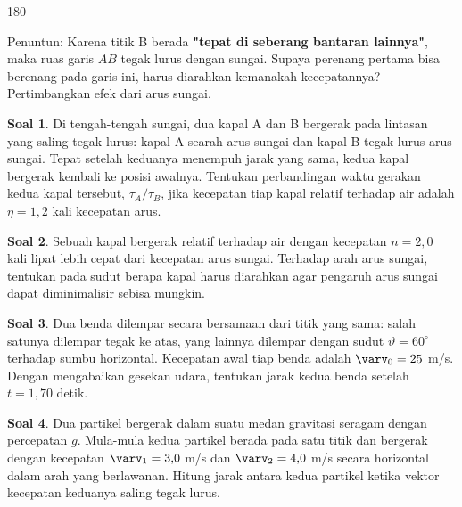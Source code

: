 \documentclass[a4paper, 11.5pt]{article}
\theoremstyle{definition}
\newtheorem{soal}{Soal}
\begin{document}
\begin{flushright}
	\begin{rotate}{180}
		\begin{minipage}{\linewidth}
			\color{lightgray}
			Penuntun: Karena titik B berada \textbf{"tepat di seberang bantaran lainnya"}, maka ruas garis $\overline{AB}$ tegak lurus dengan sungai. Supaya perenang pertama bisa berenang pada garis ini, harus diarahkan kemanakah kecepatannya? Pertimbangkan efek dari arus sungai.
		\end{minipage}
	\end{rotate}	
\end{flushright}

\vspace{1em}

\begin{soal}
	Di tengah-tengah sungai, dua kapal A dan B bergerak pada lintasan yang saling tegak lurus: kapal A searah arus sungai dan kapal B tegak lurus arus sungai. Tepat setelah keduanya menempuh jarak yang sama, kedua kapal bergerak kembali ke posisi awalnya. Tentukan perbandingan waktu gerakan kedua kapal tersebut, $\tau_A / \tau_B$, jika kecepatan tiap kapal relatif terhadap air adalah $\eta = 1{,}2$ kali kecepatan arus.
\end{soal}

\begin{soal}
	Sebuah kapal bergerak relatif terhadap air dengan kecepatan $n = 2{,}0$ kali lipat lebih cepat dari kecepatan arus sungai. Terhadap arah arus sungai, tentukan pada sudut berapa kapal harus diarahkan agar pengaruh arus sungai dapat diminimalisir sebisa mungkin.
\end{soal}

\begin{soal}
	Dua benda dilempar secara bersamaan dari titik yang sama: salah satunya dilempar tegak ke atas, yang lainnya dilempar dengan sudut $\vartheta = 60^\circ$ terhadap sumbu horizontal. Kecepatan awal tiap benda adalah $\varv_0 = 25$ m/s. Dengan mengabaikan gesekan udara, tentukan jarak kedua benda setelah $t = 1{,}70$ detik. 
\end{soal}

\begin{soal}
	Dua partikel bergerak dalam suatu medan gravitasi seragam dengan percepatan $g$. Mula-mula kedua partikel berada pada satu titik dan bergerak dengan kecepatan $\varv_1 = 3{,}0$ m/s dan $\varv_2 = 4{,}0$ m/s secara horizontal dalam arah yang berlawanan. Hitung jarak antara kedua partikel ketika vektor kecepatan keduanya saling tegak lurus.
\end{soal}
\end{document}
